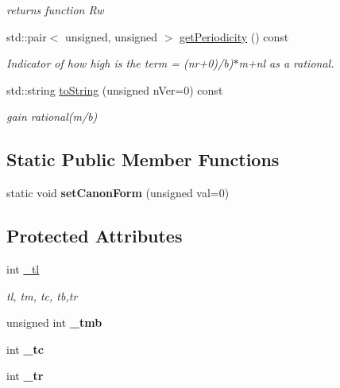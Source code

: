 \begin{DoxyCompactItemize}
\begin{DoxyCompactList}\small\item\em returns function Rw \end{DoxyCompactList}\item 
std\+::pair$<$ unsigned, unsigned $>$ \mbox{\hyperlink{classetvo_i_i_1_1d_dd_a6ef96d675203b5ea5d63792b1869c9b5}{get\+Periodicity}} () const
\begin{DoxyCompactList}\small\item\em Indicator of how high is the term = (nr+0)/b)$\ast$m+nl as a rational. \end{DoxyCompactList}\item 
\mbox{\label{classetvo_i_i_1_1d_dd_ac1cd8c2881503f0c9eae45fe55f789ba}} 
std\+::string \mbox{\hyperlink{classetvo_i_i_1_1d_dd_ac1cd8c2881503f0c9eae45fe55f789ba}{to\+String}} (unsigned n\+Ver=0) const
\begin{DoxyCompactList}\small\item\em gain rational(m/b) \end{DoxyCompactList}\end{DoxyCompactItemize}
\subsection*{Static Public Member Functions}
\begin{DoxyCompactItemize}
\item 
\mbox{\label{classetvo_i_i_1_1d_dd_ad9aad7e399605b86ef5e1ec0b684419a}} 
static void {\bfseries set\+Canon\+Form} (unsigned val=0)
\end{DoxyCompactItemize}
\subsection*{Protected Attributes}
\begin{DoxyCompactItemize}
\item 
\mbox{\label{classetvo_i_i_1_1d_dd_a510c35bee01fcdf56903f72a61295046}} 
int \mbox{\hyperlink{classetvo_i_i_1_1d_dd_a510c35bee01fcdf56903f72a61295046}{\+\_\+tl}}
\begin{DoxyCompactList}\small\item\em tl, tm, tc, tb,tr \end{DoxyCompactList}\item 
\mbox{\label{classetvo_i_i_1_1d_dd_a09bebde23ea6452d6b23501587928d6e}} 
unsigned int {\bfseries \+\_\+tmb}
\item 
\mbox{\label{classetvo_i_i_1_1d_dd_abf32f3d92e8766c2b2f6d510f0cd8765}} 
int {\bfseries \+\_\+tc}
\item 
\mbox{\label{classetvo_i_i_1_1d_dd_a47659b0cf4919ae21b1a777bea1c6941}} 
int {\bfseries \+\_\+tr}
\end{DoxyCompactItemize}
